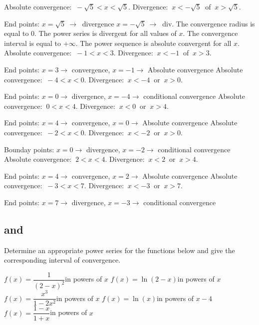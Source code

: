 \begin{Answer}

    \Question Absolute convergence: $\ -\sqrt{5} < x < \sqrt{5} $. \quad  Divergence: $\ x < -\sqrt{5} \ $ of $\ x >\sqrt{5} $.
    
     End points: $x = \sqrt{5} \ \rightarrow \ $ divergence \quad $x = -\sqrt{5} \  \rightarrow \ $ div.
    \Question The convergence radius is equal to 0. The power series is divergent for all values of $x$.
    \Question The convergence interval is equal to $+\infty$. The power sequence is absolute convergent for all $x$.
    \Question Absolute convergence: $\ -1 < x < 3 $. \quad Divergence: $\ x < -1 \ $ of $\ x > 3 $.
    
     End points: $x = 3  \rightarrow$ convergence, \quad $x = -1  \rightarrow$ Absolute convergence
    \Question Absolute convergence: $\ -4 < x < 0$. \quad Divergence: $\ x < -4\ $ or $\ x >0$.
    
    End points: $ x = 0 \rightarrow$ divergence, \quad $x = -4 \rightarrow$ conditional convergence
    \Question  Absolute convergence: $\ 0 < x < 4$. \quad Divergence: $\ x < 0\ $ or $\  x > 4$.
    
     End points: $x=4 \rightarrow$ convergence, \quad $x=0 \rightarrow$ Absolute convergence
    \Question Absolute convergence: $\ -2 < x < 0$. \quad Divergence: $\ x < -2\ $ or $\  x > 0$.
    
     Bounday points: $x=0 \rightarrow$ divergence, \quad $x=-2 \rightarrow$ conditional convergence
    \Question Absolute convergence: $\ 2 < x < 4$. \quad Divergence: $\ x<2\ $ or $\ x>4$. 
    
    End points: $x=4 \rightarrow$ convergence, \quad $x=2 \rightarrow$ Absolute convergence
    \Question Absolute convergence: $\ -3 < x < 7$. \quad Divergence: $\ x<-3\ $ or $\ x>7$. 
    
    End points: $x=7 \rightarrow$ divergence, \quad $x=-3 \rightarrow$ conditional convergence
    
\end{Answer}

\subsection*{ and }
\begin{Exercise} Determine an appropriate power series  for the functions below and give the corresponding interval of convergence.
    \begin{multicols}{2}
    \Question[difficulty = 2] $f(x)=\dfrac{1}{(2-x)^2} $\qquad in powers of $x$
    \Question[difficulty = 2] $f(x)=\ln (2-x)$\qquad in powers of $x$
    \Question[difficulty = 2] $f(x)=\dfrac{x^3}{1-2x^2}$\qquad in powers of $x$
    \Question[difficulty = 3] $f(x)=\ln (x)$\qquad in powers of $x-4$
    \Question[difficulty = 2] $f(x) = \dfrac{1-x}{1+x} $\qquad in powers of $x$
    \EndCurrentQuestion
    \end{multicols}
\end{Exercise}

